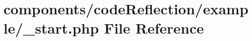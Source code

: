 \hypertarget{components_2code_reflection_2example_2__start_8php}{
\section{components/codeReflection/example/\_\-start.php File Reference}
\label{components_2code_reflection_2example_2__start_8php}
}
